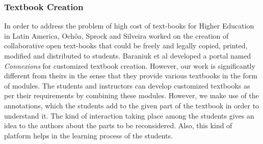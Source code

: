 \documentclass{llncs}
\begin{document}
\subsubsection{Textbook Creation}
In order to address the problem of high cost of text-books for Higher Education in Latin America, Ochôa, Sprock and Silveira\cite{Ochoa2011} worked on the creation of collaborative open text-books that could be freely and legally copied, printed, modified and distributed to students. Baraniuk et al\cite{Baraniuk2002} developed a portal named \textit{Connexions} for customized textbook creation. However, our work is significantly different from theirs in the sense that they provide various textbooks in the form of modules. The students and instructors can develop customized textbooks as per their requirements by combining these modules. However, we make use of the annotations, which the students add to the given part of the textbook in order to understand it. The kind of interaction taking place among the students gives an idea to the authors about the parts to be reconsidered. Also, this kind of platform helps in the learning process of the students.
\end{document}
